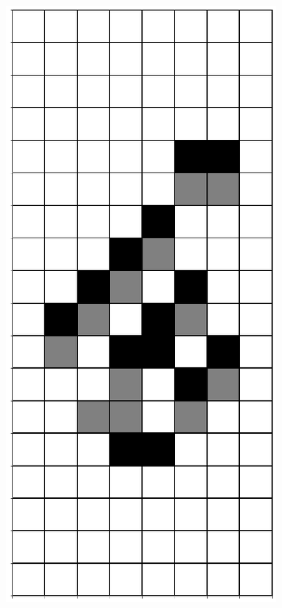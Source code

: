 \documentclass[12pt]{article}
\numberwithin{figure}{section} %
\begin{document}
\begin{figure}[H]
\begin{subfigure}{0.19\textwidth}
     		\subcaption{}
   	\end{subfigure}
     	\begin{subfigure}{0.19\textwidth}
    		\centering
     		\includegraphics[width=\linewidth]{Section4/27.1}

\end{subfigure}
\end{figure}
\end{document}
